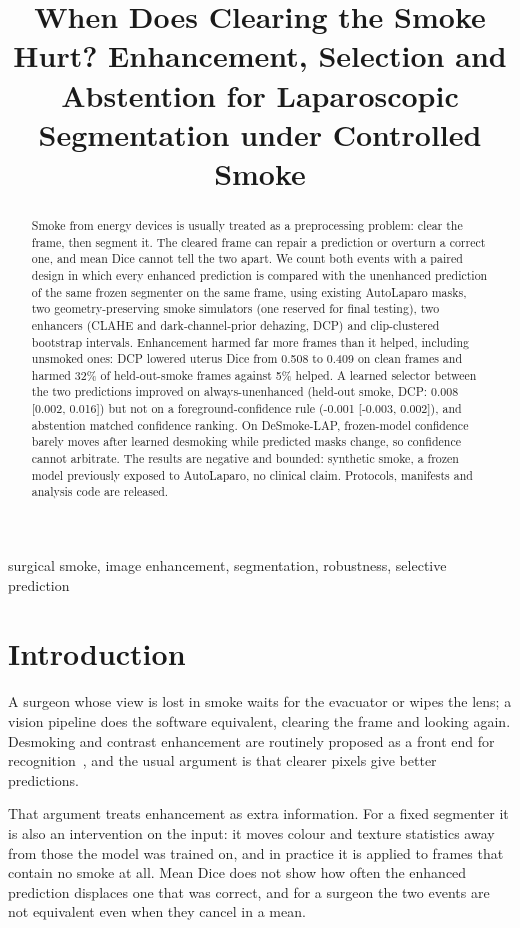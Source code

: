 \documentclass{midl}
\title[When does clearing the smoke hurt?]{When Does Clearing the Smoke Hurt? Enhancement, Selection and Abstention for Laparoscopic Segmentation under Controlled Smoke}
\begin{document}
\maketitle
\begin{abstract}
Smoke from energy devices is usually treated as a preprocessing problem: clear the frame, then segment it. The cleared frame can repair a prediction or overturn a correct one, and mean Dice cannot tell the two apart. We count both events with a paired design in which every enhanced prediction is compared with the unenhanced prediction of the same frozen segmenter on the same frame, using existing AutoLaparo masks, two geometry-preserving smoke simulators (one reserved for final testing), two enhancers (CLAHE and dark-channel-prior dehazing, DCP) and clip-clustered bootstrap intervals. Enhancement harmed far more frames than it helped, including unsmoked ones: DCP lowered uterus Dice from 0.508 to 0.409 on clean frames and harmed 32\% of held-out-smoke frames against 5\% helped. A learned selector between the two predictions improved on always-unenhanced (held-out smoke, DCP: 0.008 [0.002, 0.016]) but not on a foreground-confidence rule (-0.001 [-0.003, 0.002]), and abstention matched confidence ranking. On DeSmoke-LAP, frozen-model confidence barely moves after learned desmoking while predicted masks change, so confidence cannot arbitrate. The results are negative and bounded: synthetic smoke, a frozen model previously exposed to AutoLaparo, no clinical claim. Protocols, manifests and analysis code are released.
\end{abstract}
\begin{keywords}
surgical smoke, image enhancement, segmentation, robustness, selective prediction
\end{keywords}
\section{Introduction}
A surgeon whose view is lost in smoke waits for the evacuator or wipes the lens; a vision pipeline does the software equivalent, clearing the frame and looking again. Desmoking and contrast enhancement are routinely proposed as a front end for recognition~\citep{pan2022desmoke,lu2026seeing}, and the usual argument is that clearer pixels give better predictions.

That argument treats enhancement as extra information. For a fixed segmenter it is also an intervention on the input: it moves colour and texture statistics away from those the model was trained on, and in practice it is applied to frames that contain no smoke at all. Mean Dice does not show how often the enhanced prediction displaces one that was correct, and for a surgeon the two events are not equivalent even when they cancel in a mean.
\end{document}
